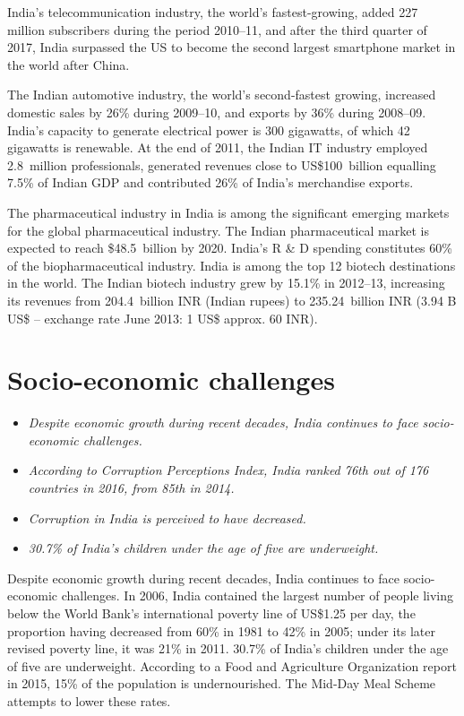 India's telecommunication industry, the world's fastest-growing, added
227 million subscribers during the period 2010--11, and after the third
quarter of 2017, India surpassed the US to become the second largest
smartphone market in the world after China.

The Indian automotive industry, the world's second-fastest growing,
increased domestic sales by 26\% during 2009--10, and exports by 36\%
during 2008--09. India's capacity to generate electrical power is 300
gigawatts, of which 42 gigawatts is renewable. At the end of 2011, the
Indian IT industry employed 2.8~million professionals, generated
revenues close to US\$100~billion equalling 7.5\% of Indian GDP and
contributed 26\% of India's merchandise exports.

The pharmaceutical industry in India is among the significant emerging
markets for the global pharmaceutical industry. The Indian
pharmaceutical market is expected to reach \$48.5~billion by 2020.
India's R \& D spending constitutes 60\% of the biopharmaceutical
industry. India is among the top 12 biotech destinations in the world.
The Indian biotech industry grew by 15.1\% in 2012--13, increasing its
revenues from 204.4~billion INR (Indian rupees) to 235.24~billion INR
(3.94 B US\$ -- exchange rate June 2013: 1 US\$ approx. 60 INR).

\section{Socio-economic challenges}\label{socio-economic-challenges}

\begin{itemize}
\item
  \emph{Despite economic growth during recent decades, India continues
  to face socio-economic challenges.}
\item
  \emph{According to Corruption Perceptions Index, India ranked 76th out
  of 176 countries in 2016, from 85th in 2014.}
\item
  \emph{Corruption in India is perceived to have decreased.}
\item
  \emph{30.7\% of India's children under the age of five are
  underweight.}
\end{itemize}

Despite economic growth during recent decades, India continues to face
socio-economic challenges. In 2006, India contained the largest number
of people living below the World Bank's international poverty line of
US\$1.25 per day, the proportion having decreased from 60\% in 1981 to
42\% in 2005; under its later revised poverty line, it was 21\% in 2011.
30.7\% of India's children under the age of five are underweight.
According to a Food and Agriculture Organization report in 2015, 15\% of
the population is undernourished. The Mid-Day Meal Scheme attempts to
lower these rates.

